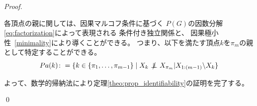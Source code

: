 \begin{proof}
\begin{quote}
\begin{enumerate}[label=(\roman*)]
    \end{enumerate}
  \end{quote}


    各頂点の親に関しては、因果マルコフ条件に基づく
    $P(G)の因数分解$\eqref{eq:factorization}によって表現される
    条件付き独立関係と、
    因果極小性~\eqref{minimality}により導くことができる。
    つまり、以下を満たす頂点$k$を$\pi_m$の親として特定することができる。
    \begin{equation*}
      Pa(k) \colon = \{ k \in \{ \pi_1, \dots, \pi_{m-1} \} \;|\;
      X_k \notindep X_{\pi_m} | X_{1:(m-1)} \backslash X_k \}
    \end{equation*}

    よって、数学的帰納法により定理\ref{theo:prop_identifiability}の証明を完了する。

  \qed
\end{proof}
